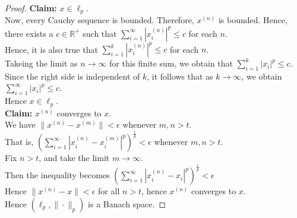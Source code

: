 \begin{eg}
\begin{enumerate}
\begin{proof}
                \textbf{Claim:} $x\in\ell_{p}$.\\
                Now, every Cauchy sequence is bounded. Therefore, $x^{(n)}$ is bounded. Hence, there exists a $c\in\mathbb{R}^{+}$ such that $\sum_{i=1}^{\infty}|x_{i}^{(n)}|^{p}\leq c$ for each $n$.\\ 
                Hence, it is also true that $\sum_{i=1}^{k}|x_{i}^{(n)}|^{p}\leq c$ for each $n$.\\ 
                Takeing the limit as $n\to\infty$ for this finite sum, we obtain that $\sum_{i=1}^{k}|x_{i}|^{p}\leq c$.\\
                Since the right side is independent of $k$, it follows that as $k\to\infty$, we obtain $\sum_{i=1}^{\infty}|x_{i}|^{p}\leq c$.\\ 
                Hence $x\in\ell_{p}$.\vspace{0.3cm}\\ 
                \textbf{Claim:} $x^{(n)}$ converges to $x$.\\
                We have $\|x^{(n)}-x^{(m)}\|<\epsilon$ whenever $m,n>t$.\\ 
                That is, $\left(\sum_{i=1}^{\infty}|x_{i}^{(n)}-x_{i}^{(m)}|^{p}\right)^{\frac{1}{p}}<\epsilon$ whenever $m,n>t$.\\ 
                Fix $n>t$, and take the limit $m\to\infty$.\\ 
                Then the inequality becomes $\left(\sum_{i=1}^{\infty}|x_{i}^{(n)}-x_{i}|^{p}\right)^{\frac{1}{p}}<\epsilon$\\
                Hence $\|x^{(n)}-x\|<\epsilon$ for all $n>t$, hence $x^{(n)}$ converges to $x$.\vspace{0.3cm}\\ 
                Hence $(\ell_{p},\|\cdot\|_{p})$ is a Banach space.
            \end{proof}
    \end{enumerate}
\end{eg}
\vspace{0.4cm}


